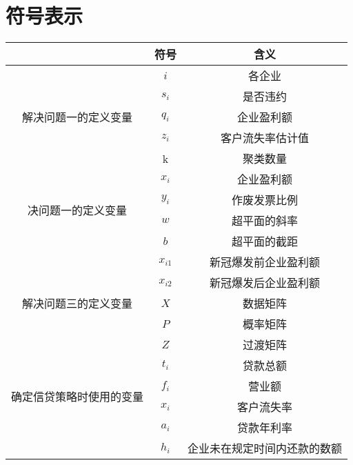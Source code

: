 \documentclass{article}
\begin{document}
\section{符号表示}
\begin{table}[htbp]
    \centering
    \begin{tabular}{|c|c|c|}
    \hline
         & 符号 & 含义 \\
        \hline
        \multirow{5}{*}{解决问题一的定义变量} & $i$      & 各企业 \\
                                    & $ s_i $ & 是否违约 \\
                                    & $ q_i $ & 企业盈利额 \\
                                    & $ z_i $ & 客户流失率估计值 \\
                                    & k & 聚类数量\\
    \hline
        \multirow{4}{*}{决问题一的定义变量} & $x_i $ &企业盈利额 \\
                                           & $ y_i $ & 作废发票比例\\
                                           & $ w $ & 超平面的斜率 \\
                                           & $b$ &  超平面的截距\\
    \hline
        \multirow{5}{*}{解决问题三的定义变量} & $x_{i1} $ & 新冠爆发前企业盈利额 \\
                                            & $ x_{i2} $ & 新冠爆发后企业盈利额 \\
                                            & $X$ & 数据矩阵 \\
                                            & $P$ & 概率矩阵 \\
                                            & $Z$ & 过渡矩阵 \\
    \hline
        \multirow{4}{*}{确定信贷策略时使用的变量} & $t_i$ & 贷款总额 \\
                                                & $f_i$ & 营业额 \\
                                                & $x_i$ & 客户流失率 \\
                                                & $a_i$ & 贷款年利率 \\
                                                & $h_i$ & 企业未在规定时间内还款的数额 \\
    \hline                                    
    \end{tabular}
\end{table}
\end{document}
